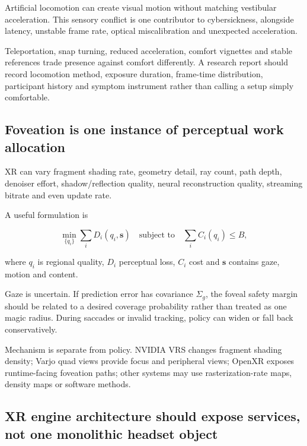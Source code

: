 \hypertarget{04-visual-computing-ii-ch035-locomotion-and-cybersickness-connect-graphics-to-physiology}{}

Artificial locomotion can create visual motion without matching vestibular acceleration. This sensory conflict is one contributor to cybersickness, alongside latency, unstable frame rate, optical miscalibration and unexpected acceleration.

Teleportation, snap turning, reduced acceleration, comfort vignettes and stable references trade presence against comfort differently. A research report should record locomotion method, exposure duration, frame-time distribution, participant history and symptom instrument rather than calling a setup simply comfortable.

\subsection{Foveation is one instance of perceptual work allocation}\label{04-visual-computing-ii-ch035-foveation-is-one-instance-of-perceptual-work-allocation}

\hypertarget{04-visual-computing-ii-ch035-foveation-is-one-instance-of-perceptual-work-allocation}{}

XR can vary fragment shading rate, geometry detail, ray count, path depth, denoiser effort, shadow/reflection quality, neural reconstruction quality, streaming bitrate and even update rate.

A useful formulation is

\[
\min_{\{q_i\}}\sum_i D_i(q_i,\mathbf{s})
\quad\text{subject to}\quad
\sum_i C_i(q_i)\le B,
\]

where \(q_i\) is regional quality, \(D_i\) perceptual loss, \(C_i\) cost and \(\mathbf s\) contains gaze, motion and content.

Gaze is uncertain. If prediction error has covariance \(\Sigma_g\), the foveal safety margin should be related to a desired coverage probability rather than treated as one magic radius. During saccades or invalid tracking, policy can widen or fall back conservatively.

Mechanism is separate from policy. NVIDIA VRS changes fragment shading density; Varjo quad views provide focus and peripheral views; OpenXR exposes runtime-facing foveation paths; other systems may use rasterization-rate maps, density maps or software methods.

\subsection{XR engine architecture should expose services, not one monolithic headset object}\label{04-visual-computing-ii-ch035-xr-engine-architecture-should-expose-services-not-one-monolithic-headset-object}

